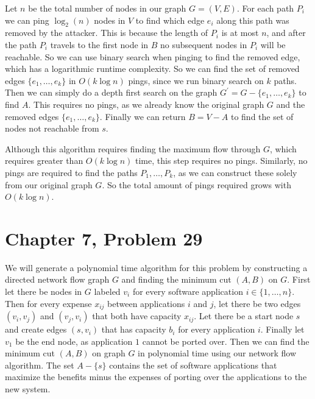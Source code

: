 \documentclass[12pt]{article}
\begin{document}
Let \(n\) be the total number of nodes in our graph \(G=(V,E)\). For each path \(P_i\) we can ping \(\log_2(n)\) nodes in \(V\) to find which edge \(e_i\) along
this path was removed by the attacker. This is because the length of \(P_i\) is at most \(n\), and after the path \(P_i\) travels to the first node in \(B\)
no subsequent nodes in \(P_i\) will be reachable. So we can use binary search when pinging to find the removed edge, which has a logarithmic runtime complexity.
So we can find the set of removed edges \(\{e_1,\ldots,e_k\}\) in \(O(k\log n)\) pings, since we run binary search on \(k\) paths. Then
we can simply do a depth first search on the graph \(G^\prime=G-\{e_1,\ldots,e_k\}\) to find \(A\). This requires no pings, as we already know the original graph
\(G\) and the removed edges \(\{e_1,\ldots,e_k\}\). Finally we can return \(B=V-A\) to find the set of nodes not reachable from \(s\).

Although this algorithm requires finding the maximum flow through \(G\), which requires greater than \(O(k\log n)\) time, this step requires no pings. Similarly, no
pings are required to find the paths \(P_1,\ldots,P_k\), as we can construct these solely from our original graph \(G\). So the total amount of pings required grows with
\(O(k\log n)\).

\pagebreak

\section*{Chapter 7, Problem 29}

We will generate a polynomial time algorithm for this problem by constructing a directed network flow graph \(G\) and finding the minimum cut \((A,B)\)
on \(G\). First let there be nodes in \(G\) labeled \(v_i\) for every software application \(i\in\{1,\ldots,n\}\). Then for every expense \(x_{ij}\) between
applications \(i\) and \(j\), let there be two edges \((v_i,v_j)\) and \((v_j,v_i)\) that both have capacity \(x_{ij}\). Let there be a start node
\(s\) and create edges \((s,v_i)\) that has capacity \(b_i\) for every application \(i\). Finally let \(v_1\) be the end node, as application \(1\) cannot be ported over.
Then we can find the minimum cut \((A,B)\) on graph \(G\) in polynomial time using our network flow algorithm. The set \(A-\{s\}\) contains the set of
software applications that maximize the benefits minus the expenses of porting over the applications to the new system.
\end{document}
